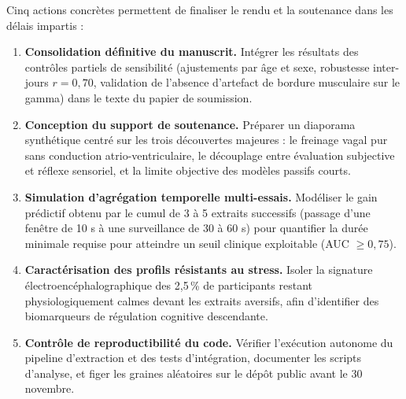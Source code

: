 \documentclass[10pt,a4paper]{article}
\begin{document}
Cinq actions concrètes permettent de finaliser le rendu et la soutenance dans les délais impartis :

\begin{enumerate}
  \item \textbf{Consolidation définitive du manuscrit.} Intégrer les résultats des contrôles partiels de sensibilité (ajustements par âge et sexe, robustesse inter-jours $r = 0,70$, validation de l'absence d'artefact de bordure musculaire sur le gamma) dans le texte du papier de soumission.
  \item \textbf{Conception du support de soutenance.} Préparer un diaporama synthétique centré sur les trois découvertes majeures : le freinage vagal pur sans conduction atrio-ventriculaire, le découplage entre évaluation subjective et réflexe sensoriel, et la limite objective des modèles passifs courts.
  \item \textbf{Simulation d'agrégation temporelle multi-essais.} Modéliser le gain prédictif obtenu par le cumul de 3 à 5 extraits successifs (passage d'une fenêtre de 10 s à une surveillance de 30 à 60 s) pour quantifier la durée minimale requise pour atteindre un seuil clinique exploitable (AUC $\ge 0,75$).
  \item \textbf{Caractérisation des profils résistants au stress.} Isoler la signature électroencéphalographique des 2,5\,\% de participants restant physiologiquement calmes devant les extraits aversifs, afin d'identifier des biomarqueurs de régulation cognitive descendante.
  \item \textbf{Contrôle de reproductibilité du code.} Vérifier l'exécution autonome du pipeline d'extraction et des tests d'intégration, documenter les scripts d'analyse, et figer les graines aléatoires sur le dépôt public avant le 30 novembre.
\end{enumerate}
\end{document}

